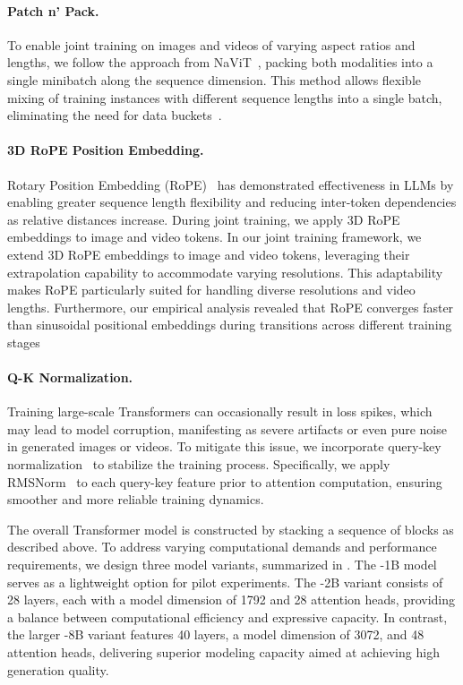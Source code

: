 \paragraph{Patch n’ Pack.} To enable joint training on images and videos of varying aspect ratios and lengths, we follow the approach from NaViT~\citep{dehghani2024patch}, packing both modalities into a single minibatch along the sequence dimension. This method allows flexible mixing of training instances with different sequence lengths into a single batch, eliminating the need for data buckets~\citep{podell2023sdxl}.

\paragraph{3D RoPE Position Embedding.} Rotary Position Embedding (RoPE)~\citep{su2024roformer} has demonstrated effectiveness in LLMs by enabling greater sequence length flexibility and reducing inter-token dependencies as relative distances increase. During joint training, we apply 3D RoPE embeddings to image and video tokens. In our joint training framework, we extend 3D RoPE embeddings to image and video tokens, leveraging their extrapolation capability to accommodate varying resolutions. This adaptability makes RoPE particularly suited for handling diverse resolutions and video lengths. Furthermore, our empirical analysis revealed that RoPE converges faster than sinusoidal positional embeddings during transitions across different training stages

\paragraph{Q-K Normalization.} Training large-scale Transformers can occasionally result in loss spikes, which may lead to model corruption, manifesting as severe artifacts or even pure noise in generated images or videos. To mitigate this issue, we incorporate query-key normalization~\citep{dehghani2023scaling} to stabilize the training process. Specifically, we apply RMSNorm~\citep{zhang2019root} to each query-key feature prior to attention computation, ensuring smoother and more reliable training dynamics.





The overall Transformer model is constructed by stacking a sequence of blocks as described above. To address varying computational demands and performance requirements, we design three model variants, summarized in . The \ours-1B model serves as a lightweight option for pilot experiments. The \ours-2B variant consists of 28 layers, each with a model dimension of 1792 and 28 attention heads, providing a balance between computational efficiency and expressive capacity. In contrast, the larger \ours-8B variant features 40 layers, a model dimension of 3072, and 48 attention heads, delivering superior modeling capacity aimed at achieving high generation quality.


